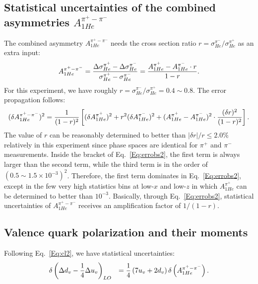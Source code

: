\subsection{Statistical uncertainties of the combined asymmetries  $A_{1He}^{\pi^+ - \pi^-}$ }
The combined asymmetry $A_{1He}^{\pi^+ - \pi^-}$ needs the 
 cross section ratio $r=\sigma_{He}^{\pi^-}/\sigma_{He}^{\pi^+}$ as an extra input:
\begin{equation}
\label{Eq:obs2}
A_{1He}^{\pi^+ - \pi^-}  =  { \Delta \sigma_{He}^{\pi^+} -\Delta \sigma_{He}^{\pi^-} \over
\sigma_{He}^{\pi^+} - \sigma_{He}^{\pi^-} }=
{ A_{1He}^{\pi^+} -  A_{1He}^{\pi^-} \cdot r
\over 1 - r }.
\end{equation}
For this experiment, we have roughly $r=\sigma^{\pi^-}_{He}/\sigma^{\pi^+}_{He}=0.4 \sim 0.8$. 
The error propagation follows:
\begin{equation}
\label{Eq:errobs2}
(\delta A_{1He}^{\pi^+ - \pi^-})^2  = {1 \over (1 - r)^2} \left[ (\delta  A_{1He}^{\pi^+} )^2 + 
r^2 (\delta  A_{1He}^{\pi^-} )^2
+(A_{1He}^{\pi^+} - A_{1He}^{\pi^-} )^2   \cdot {(\delta r)^2  \over (1 - r)^2}  \right].
\end{equation}
The value of $r$ can be reasonably determined to better than 
 $|\delta r|/r \le 2.0 \%$  relatively in this experiment since phase spaces are identical for $\pi^+$ and 
$\pi^-$ measurements.  
 Inside the bracket of Eq.~\ref{Eq:errobs2}, the first term is always larger than the second term, while the third term is in the order of $(0.5\sim 1.5 \times10^{-3})^2$. 
Therefore, the first term dominates in Eq.~\ref{Eq:errobs2}, except in the few very high statistics bins at low-$x$ and low-$z$ in which  $A_{1He}^{\pi^+}$ can be  determined to better than $10^{-3}$. Basically, through Eq.~\ref{Eq:errobs2}, statistical uncertainties of $A_{1He}^{\pi^+ - \pi^-}$ receives an amplification factor  of $1/(1-r)$.

\subsection{Valence quark polarization and their moments}
Following Eq.~\ref{Eq:cl2},  we have  statistical uncertainties:
\begin{eqnarray}
\label{Eq:errcl2}
& \delta \left( \Delta d_v-{1 \over 4} \Delta u_v  \right)_{LO} &  = {1 \over 4} \left( 7 u_v + 2 d_v \right)  \delta \left(A_{1He}^{\pi^+ - \pi^-} \right).
\end{eqnarray}

